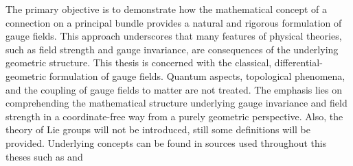 The primary objective is to demonstrate how the mathematical concept of a connection on a principal bundle provides a natural and rigorous formulation of gauge fields. This approach underscores that many features of physical theories, such as field strength and gauge invariance, are consequences of the underlying geometric structure.
This thesis is concerned with the classical, differential-geometric formulation of gauge fields. Quantum aspects, topological phenomena, and the coupling of gauge fields to matter are not treated. The emphasis lies on comprehending the mathematical structure underlying gauge invariance and field strength in a coordinate-free way from a purely geometric perspective. Also, the theory of Lie groups will not be introduced, still some definitions will be provided. Underlying concepts can be found in sources used throughout this theses such as \cite{RaghunathanLieGroupsLieAlgebras2025} and \cite{NakaharaGeometrytopologyphysics2005}
